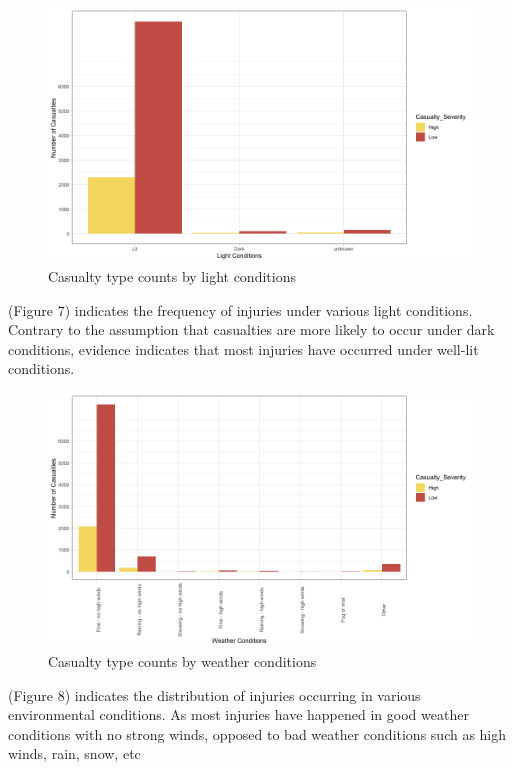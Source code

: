\documentclass[
  a4paper,
]{article}
\begin{document}
\newpage
\begin{figure}[h!]

{\centering \includegraphics[width=0.75\linewidth]{lc} 

}

\caption{Casualty type counts by light conditions}\label{fig:unnamed-chunk-8}
\end{figure}

(Figure 7) indicates the frequency of injuries under various light
conditions. Contrary to the assumption that casualties are more likely
to occur under dark conditions, evidence indicates that most injuries
have occurred under well-lit conditions.

\begin{figure}[h!]

{\centering \includegraphics[width=0.75\linewidth]{wc} 

}

\caption{Casualty type counts by weather conditions}\label{fig:unnamed-chunk-9}
\end{figure}

(Figure 8) indicates the distribution of injuries occurring in various
environmental conditions. As most injuries have happened in good weather
conditions with no strong winds, opposed to bad weather conditions such
as high winds, rain, snow, etc
\end{document}
